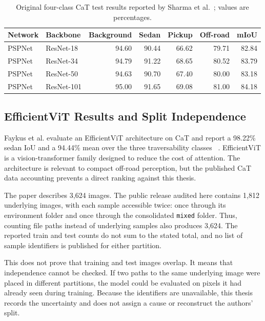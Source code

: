 \begin{table}[H]
\centering
\caption{Original four-class CaT test results reported by Sharma et al.\
\cite{sharma2022cat}; values are percentages.}
\label{tab:cat_original_literature}
\small
\begin{tabular}{@{}llrrrrr@{}}
\toprule
\textbf{Network} & \textbf{Backbone} & \textbf{Background} & \textbf{Sedan} & \textbf{Pickup} & \textbf{Off-road} & \textbf{mIoU} \\
\midrule
PSPNet & ResNet-18  & 94.60 & 90.44 & 66.62 & 79.71 & 82.84 \\
PSPNet & ResNet-34  & 94.79 & 91.22 & 68.65 & 80.52 & 83.79 \\
PSPNet & ResNet-50  & 94.63 & 90.70 & 67.40 & 80.00 & 83.18 \\
PSPNet & ResNet-101 & 95.00 & 91.65 & 69.08 & 81.00 & 84.18 \\
\bottomrule
\end{tabular}
\end{table}

\subsection{EfficientViT Results and Split Independence}

Faykus et al. evaluate an EfficientViT architecture on CaT and report a
98.22\% sedan IoU and a 94.44\% mean over the three traversability classes
~\cite{efficientvit_offroad}. EfficientViT is a vision-transformer family
designed to reduce the cost of attention. The architecture is relevant to
compact off-road perception, but the published CaT data accounting prevents a
direct ranking against this thesis.

The paper describes 3,624 images. The public release audited here contains
1,812 underlying images, with each sample accessible twice: once through its
environment folder and once through the consolidated \texttt{mixed} folder.
Thus, counting file paths instead of underlying samples also produces 3,624.
The reported train and test counts do not sum to the stated total, and no list
of sample identifiers is published for either partition.

This does not prove that training and test images overlap. It means that
independence cannot be checked. If two paths to the same underlying image were
placed in different partitions, the model could be evaluated on pixels it had
already seen during training. Because the identifiers are unavailable, this
thesis records the uncertainty and does not assign a cause or reconstruct the
authors' split.

